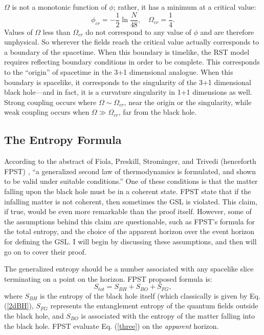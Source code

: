 \documentclass[12pt]{article}
\begin{document}
$\Omega$ is not a monotonic function of $\phi$; rather, it has a minimum at a critical value:
\begin{equation}
\phi_{cr} = -\frac{1}{2}\ln \frac{N}{48},\quad \Omega_{cr} = \frac{1}{4}.
\end{equation}
Values of $\Omega$ less than $\Omega_{cr}$ do not correspond to any value of $\phi$ and are therefore unphysical.  So wherever the fields reach the critical value actually corresponds to a boundary of the spacetime.  When this boundary is timelike, the RST model requires reflecting boundary conditions in order to be complete.  This corresponds to the ``origin'' of spacetime in the 3+1 dimensional analogue.  When this boundary is spacelike, it corresponds to the singularity of the 3+1 dimensional black hole---and in fact, it is a curvature singularity in 1+1 dimensions as well.  Strong coupling occurs where $\Omega \sim \Omega_{cr}$, near the origin or the singularity, while weak coupling occurs when $\Omega \gg \Omega_{cr}$, far from the black hole.

\subsection{The Entropy Formula}

According to the abstract of Fiola, Preskill, Strominger, and Trivedi (henceforth FPST) \cite{fiola94}, ``a generalized second law of thermodynamics is formulated, and shown to be valid under suitable conditions.''  One of these conditions is that the matter falling upon the black hole must be in a coherent state.  FPST state that if the infalling matter is not coherent, then sometimes the GSL is violated.  This claim, if true, would be even more remarkable than the proof itself.  However, some of the assumptions behind this claim are questionable, such as FPST's formula for the total entropy, and the choice of the apparent horizon over the event horizon for defining the GSL.  I will begin by discussing these assumptions, and then will go on to cover their proof.

The generalized entropy should be a number associated with any spacelike slice terminating on a point on the horizon.  FPST proposed formula is:
\begin{equation}\label{three}
S_{tot} = S_{BH} + S_{BO} + S_{FG},
\end{equation}
where $S_{BH}$ is the entropy of the black hole itself (which classically is given by Eq. (\ref{2dBH}), $S_{FG}$ represents the entanglement entropy of the quantum fields outside the black hole, and $S_{BO}$ is associated with the entropy of the matter falling into the black hole.  FPST evaluate Eq. (\ref{three}) on the \emph{apparent} horizon.
\end{document}

